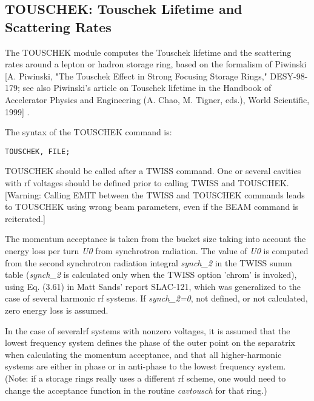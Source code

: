 


 
 

\subsection{TOUSCHEK: Touschek Lifetime and Scattering Rates}

The TOUSCHEK module computes the Touschek lifetime and the scattering rates 
 around a lepton or hadron storage ring, based on the formalism of Piwinski [A. 
 Piwinski, "The Touschek Effect in Strong Focusing Storage Rings," DESY-98-179; 
 see also Piwinski's article on Touschek lifetime in the Handbook of Accelerator 
 Physics and Engineering (A. Chao, M. Tigner, eds.), World Scientific, 1999] .

The syntax of the TOUSCHEK command is: 
\begin{verbatim}
TOUSCHEK, FILE;
\end{verbatim}TOUSCHEK should be called after a TWISS command. One or several cavities 
 with rf voltages should be defined prior to calling TWISS and TOUSCHEK. 
 [Warning: Calling EMIT between the TWISS and TOUSCHEK commands leads to TOUSCHEK using wrong beam parameters, even if the BEAM command is reiterated.]
 

The momentum acceptance is taken from the bucket size taking into account the 
 energy loss per turn \textit{U0 }from synchrotron radiation. The value of \textit{U0} 
 is computed from the second synchrotron radiation integral \textit{synch\_2} in the 
 TWISS summ table (\textit{synch\_2} is calculated only when the TWISS option 'chrom' 
 is invoked), using Eq. (3.61) in Matt Sands' report SLAC-121, which was 
 generalized to the case of several harmonic rf systems. If \textit{synch\_2=0}, not 
 defined, or not calculated, zero energy loss is assumed. 

In the case of several\nolinebreak rf systems with nonzero voltages, it is assumed 
 that the lowest frequency system defines the phase of the outer point on the 
 separatrix when calculating the momentum acceptance, and that all 
 higher-harmonic systems are either in phase or in anti-phase to the lowest 
 frequency system. (Note: if a storage rings really uses a different rf scheme, 
 one would need to change the acceptance function in the routine \textit{cavtousch }
 for that ring.) 
\\
 \nolinebreak


